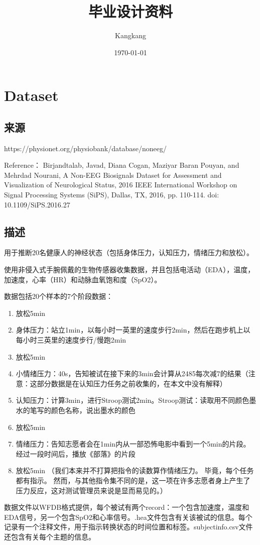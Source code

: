 \documentclass[UTF8]{ctexart}
\title{毕业设计资料}
\author{Kangkang}
\date{\today}
\begin{document}
\maketitle
\section{Dataset}
\subsection{来源}
https://physionet.org/physiobank/database/noneeg/

Reference：
Birjandtalab, Javad, Diana Cogan, Maziyar Baran Pouyan, and Mehrdad Nourani, A Non-EEG Biosignals Dataset for Assessment and Visualization of Neurological Status, 2016 IEEE International Workshop on Signal Processing Systems (SiPS), Dallas, TX, 2016, pp. 110-114. doi: 10.1109/SiPS.2016.27
\subsection{描述}
用于推断20名健康人的神经状态（包括身体压力，认知压力，情绪压力和放松）。

使用非侵入式手腕佩戴的生物传感器收集数据，并且包括电活动（EDA），温度，加速度，心率（HR）和动脉血氧饱和度（SpO2）。

数据包括20个样本的7个阶段数据：
\begin{enumerate}
\item 放松5min
\item 身体压力：站立1min，以每小时一英里的速度步行2min，然后在跑步机上以每小时三英里的速度步行/慢跑2min
\item 放松5min
\item 小情绪压力：40s，告知被试在接下来的3min会计算从2485每次减7的结果（注意：这部分数据是在认知压力任务之前收集的，在本文中没有解释）
\item 认知压力：计算3min，进行Stroop测试2min。Stroop测试：读取用不同颜色墨水的笔写的颜色名称，说出墨水的颜色
\item 放松5min
\item 情绪压力：告知志愿者会在1min内从一部恐怖电影中看到一个5min的片段。 经过一段时间后，播放《部落》的片段
\item 放松5min
（我们本来并不打算把指令的读数算作情绪压力。 毕竟，每个任务都有指示。 然而，与其他指令集不同的是，这一项在许多志愿者身上产生了压力反应，这对测试管理员来说是显而易见的。）
\end{enumerate}
数据文件以WFDB格式提供，每个被试有两个record：一个包含加速度，温度和EDA信号，另一个包含SpO2和心率信号。.hea文件包含有关该被试的信息。每个记录有一个注释文件，用于指示转换状态的时间位置和标签。subjectinfo.csv文件还包含有关每个主题的信息。
\end{document}

